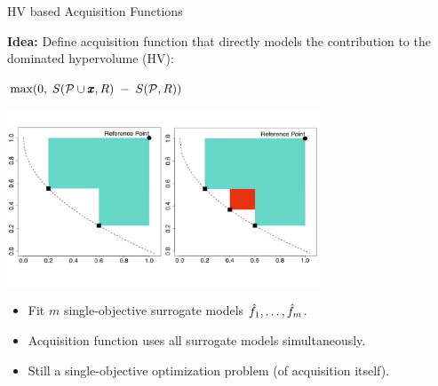 \documentclass[11pt,compress,t,notes=noshow,xcolor=table]{beamer}
\begin{document}
\begin{vbframe}{HV based Acquisition Functions}

\textbf{Idea:} Define acquisition function that directly models the contribution to the dominated hypervolume (HV):

$\max(0, \; S(\mathcal{P} \cup \pmb{x}, R) \;-\; S(\mathcal{P}, R))$

\begin{center}
\includegraphics[width=0.7\textwidth]{slides/11-multicrit/figure_man/hv_contribution.pdf}
\end{center}

\vspace{-0.8cm}

\begin{itemize}
  \item Fit $m$ single-objective surrogate models $\hat{f}_1, \dots, \hat{f}_m$.
  \item Acquisition function uses all surrogate models simultaneously.
  \item Still a single-objective optimization problem (of acquisition itself).
\end{itemize}

\end{vbframe}
\end{document}
